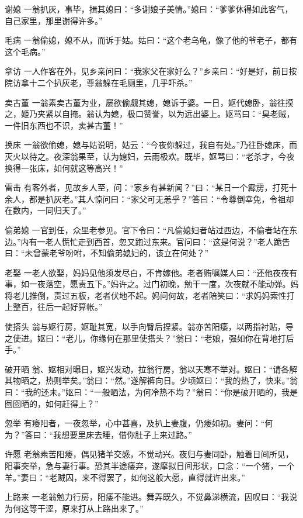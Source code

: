 \documentclass[12pt,UTF8]{ctexbook}
\begin{document}
谢媳
一翁扒灰，事毕，揖其媳曰：“多谢娘子美情。”媳曰：“爹爹休得如此客气，自己家里，那里谢得许多。”

毛病
一翁偷媳，媳不从，而诉于姑。姑曰：“这个老乌龟，像了他的爷老子，都有这个毛病。”

拿访
一人作客在外，见乡亲问曰：“我家父在家好么？”乡亲曰：“好是好，前日按院访拿十二个扒灰老，尊翁躲在毛厕里，几乎吓杀。”

卖古董
一翁素卖古董为业，屡欲偷觑其媳，媳诉于婆。一日，妪代媳卧，翁往摸之，姬乃夹紧以自掩。翁认为媳，极口赞誉，以为远出婆上。妪骂曰：“臭老贼，一件旧东西也不识，卖甚古董！”

换床
一翁欲偷媳，媳与姑说明，姑云：“今夜你躲过，我自有处。”乃往卧媳床，而灭火以待之。夜深翁果至，认为媳妇，云雨极欢。既毕，妪骂曰：“老杀才，今夜换得一张床，如何就这等高兴！”

雷击
有客外者，见故乡人至，问：“家乡有甚新闻？”曰：“某日一个霹雳，打死十余人，都是扒灰老。”其人惊问曰：“家父可无恙乎？”答曰：“令尊倒幸免，令祖却在数内，一同归天了。”

偷弟媳
一官到任，众里老参见。官下令曰：“凡偷媳妇者站过西边，不偷者站在东边。”内有一老人慌忙走到西首，忽又跑过东来。官问曰：“这是何说？”老人跪告曰：“未曾蒙老爷吩咐，不知偷弟媳妇的，该立在何处？”

老娶
一老人欲娶，妈妈见他须发尽白，不肯嫁他。老者贿嘱媒人曰：“还他夜夜有事，如一夜落空，愿责五下。”妈许之。过门初晚，勉干一度，次夜就不能动弹。妈将老儿推倒，责过五板，老者伏地不起。妈问何故，老者陪笑曰：“求妈妈索性打上整百，往后一起好算帐。”

使搭头
翁与妪行房，妪耻其宽，以手向臀后捏紧。翁亦苦阳痿，以两指衬贴，导之使进。妪曰：“老儿，你缘何在那里使搭头？”翁曰：“老娘，强如你在背地打后手。”

破开晒
翁、妪相对曝日，妪兴发动，拉翁行房，翁以天寒不举对。妪曰：“请各解其物晒之，热则举矣。”翁曰：“然。”遂解裤向日。少顷妪曰：“我的热了，快来。”翁曰：“我的还未。”妪曰：“一般晒法，为何冷热不均？”翁曰：“你是破开晒的，我是囫囵晒的，如何赶得上？”

忽举
有痿阳者，一夜忽举，心中甚喜，及扒上妻腹，仍痿如初。妻问：“何为？”答曰：“我想要里床去睡，借你肚子上来过路。”

许愿
老翁素苦阳痿，偶见猪羊交感，不觉动兴。夜归与妻同卧，触着日间所见，阳事突举，急与妻行事。恐其半途痿弃，遂摩拟日间形状，口念：“一个猪，一个羊。”妻曰：“老贼囚，来不得罢了，如何这般大愿，直得就许出来。”

上路来
一老翁勉力行房，阳痿不能进。舞弄既久，不觉鼻涕横流，因叹曰：“我说为何这等干涩，原来打从上路出来了。”
\end{document}
